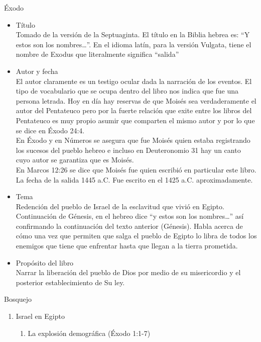 %
%
\begin{section}{Éxodo}
	\begin{itemize}
		\item Título\\
Tomado de la versión de la Septuaginta. El título en la Biblia hebrea es: ``Y estos son los nombres\ldots''. En el idioma latín, para la versión Vulgata, tiene el nombre de Exodus que literalmente significa ``salida''
		\item Autor y fecha\\
El autor claramente es un testigo ocular dada la narración de los eventos. El tipo de vocabulario que se ocupa dentro del libro nos  indica que fue una persona letrada. Hoy en día hay reservas de que Moisés sea verdaderamente el autor del Pentateuco pero por la fuerte relación que exite entre los libros del Pentateuco es muy propio asumir que comparten el mismo autor y por lo que se dice en Éxodo 24:4.\\
En Éxodo y en Números se asegura que fue Moisés quien estaba registrando los sucesos del pueblo hebreo e incluso en Deuteronomio 31 hay un canto cuyo autor se garantiza que es Moisés.\\
En  Marcos 12:26 se dice que Moisés fue quien escribió en particular este libro. La fecha de la salida 1445 a.C. Fue escrito en el 1425 a.C. aproximadamente.
		\item Tema\\
		Redención del pueblo de Israel de la esclavitud que vivió en Egipto. Continuación de Génesis, en el hebreo dice ``y estos son los nombres\ldots'' así confirmando la continuación del texto anterior (Génesis). Habla acerca de cómo una vez que permiten que salga el pueblo de Egipto lo libra de todos los enemigos que tiene que enfrentar hasta que llegan a la tierra prometida.
\item Propósito del libro\\
Narrar la liberación del pueblo de Dios por medio de su misericordio y el posterior establecimiento de Su ley.
	\end{itemize}
	\begin{subsection}{Bosquejo}
		\begin{enumerate}
			\item Israel en Egipto
				\begin{enumerate}
					\item La explosión demográfica (Éxodo 1:1-7)\\

\end{enumerate}
\end{enumerate}
\end{subsection}
\end{section}
